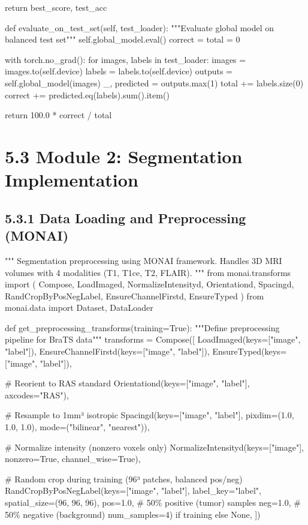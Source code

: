         return best\_score, test\_acc
    
    def evaluate\_on\_test\_set(self, test\_loader):
        """Evaluate global model on balanced test set"""
        self.global\_model.eval()
        correct = total = 0
        
        with torch.no\_grad():
            for images, labels in test\_loader:
                images = images.to(self.device)
                labels = labels.to(self.device)
                outputs = self.global\_model(images)
                \_, predicted = outputs.max(1)
                total += labels.size(0)
                correct += predicted.eq(labels).sum().item()
        
        return 100.0 * correct / total


\section{5.3 Module 2: Segmentation Implementation}

\subsection{5.3.1 Data Loading and Preprocessing (MONAI)}
"""
Segmentation preprocessing using MONAI framework.
Handles 3D MRI volumes with 4 modalities (T1, T1ce, T2, FLAIR).
"""
from monai.transforms import (
    Compose, LoadImaged, NormalizeIntensityd, 
    Orientationd, Spacingd, RandCropByPosNegLabel,
    EnsureChannelFirstd, EnsureTyped
)
from monai.data import Dataset, DataLoader

def get\_preprocessing\_transforms(training=True):
    """Define preprocessing pipeline for BraTS data"""
    transforms = Compose([
        LoadImaged(keys=["image", "label"]),
        EnsureChannelFirstd(keys=["image", "label"]),
        EnsureTyped(keys=["image", "label"]),
        
        \# Reorient to RAS standard
        Orientationd(keys=["image", "label"], axcodes="RAS"),
        
        \# Resample to 1mm³ isotropic
        Spacingd(keys=["image", "label"], 
                pixdim=(1.0, 1.0, 1.0),
                mode=("bilinear", "nearest")),
        
        \# Normalize intensity (nonzero voxels only)
        NormalizeIntensityd(keys=["image"], 
                           nonzero=True, 
                           channel\_wise=True),
        
        \# Random crop during training (96³ patches, balanced pos/neg)
        RandCropByPosNegLabel(keys=["image", "label"],
                             label\_key="label",
                             spatial\_size=(96, 96, 96),
                             pos=1.0,  \# 50\% positive (tumor) samples
                             neg=1.0,  \# 50\% negative (background)
                             num\_samples=4) if training else None,
    ])
    
